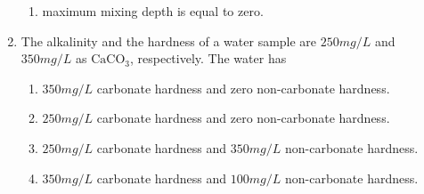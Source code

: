 \documentclass[journal]{IEEEtran}
\begin{document}
\begin{enumerate}
\begin{enumerate}
			\item maximum mixing depth is equal to zero.
		\end{enumerate}
	\item 
	The alkalinity and the hardness of a water sample are $250 mg/L$ and $350 mg/L$ as $\text{CaCO}_3$, respectively. The water has 
		\begin{enumerate}
			\item $350 mg/L$ carbonate hardness and zero non-carbonate hardness.
			\item $250 mg/L$ carbonate hardness and zero non-carbonate hardness.
			\item $250 mg/L$ carbonate hardness and $350 mg/L$ non-carbonate hardness.
			\item $350 mg/L$ carbonate hardness and $100 mg/L$ non-carbonate hardness.
		\end{enumerate}
	
	







\end{enumerate}
\end{document}
